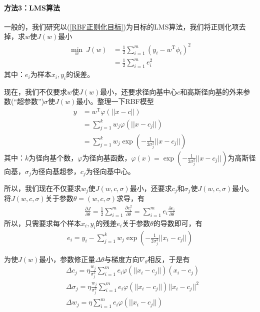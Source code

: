             \paragraph{方法3：LMS算法}
            一般的，我们研究以(\ref{RBF正则化目标})为目标的LMS算法，我们将正则化项去掉，求$w$使$J(w)$最小
            \begin{align*}
            \min_w \ J(w) & = \frac{1}{2} \sum_{i=1}^m \left( y_i - w^\mathrm{T}\phi_i \right) ^2 \\
            & = \frac{1}{2}\sum_{i=1}^m e_i^2
            \end{align*}
            其中：$e_i$为样本$x_i,y_i$的误差。
            \par
            现在，我们不仅要求$w$使$J(w)$最小，还要求径向基中心$c$和高斯径向基的外来参数(“超参数”)$\sigma$使$J(w)$最小。整理一下RBF模型
            \begin{align*}
            y & = w^\mathrm{T}\varphi(||x-c||)\\
            & =\sum_{j=1}^k w_j\varphi(||x-c_j||)\\
            & =\sum_{j=1}^k w_j\exp \left( -\frac{1}{2\sigma_j^2}||x-c_j|| \right)
            \end{align*}
            其中：$k$为径向基个数，$\varphi$为径向基函数，$\varphi(x) = \exp \left( -\frac{1}{2\sigma_j^2}||x-c_j|| \right) $为高斯径向基，$\sigma_j$为径向基超参，$c_j$为径向基中心。
            \par
            所以，我们现在不仅要求$w_j$使$J(w,c,\sigma)$最小，还要求$c_j$和$\sigma_j$使$J(w,c,\sigma)$最小。将$J(w,c,\sigma)$关于参数$\theta = (w,c,\sigma)$求导，有
            \begin{align*}
            \frac{\partial J}{\partial \theta} = \frac{1}{2} \sum_{i=1}^m \frac{\partial e_i^2}{\partial \theta} = \sum_{i=1}^m e_i \frac{\partial e_i}{\partial \theta}
            \end{align*}
            所以，只需要求每个样本$x_i,y_i$的残差$e_i$关于参数$\theta$的导数即可，有
            \begin{align*}
            e_i = y_i - \sum_{j=1}^k w_j\exp \left( -\frac{1}{2\sigma_j^2}||x_i-c_j|| \right)
            \end{align*}
            \par
            为使$J(w)$最小，参数修正量$\Delta \theta$与梯度方向$\nabla_\theta$相反，于是有
            \begin{align*}
            & \Delta c_j = \eta \frac{w_j}{\sigma_j^2} \sum_{i=1}^m e_i \varphi (||x_i-c_j||)(x_i-c_j)\\
            & \Delta \sigma_j = \eta \frac{w_j}{\sigma_j^2} \sum_{i=1}^m e_i \varphi (||x_i-c_j||)||x_i-c_j||^2\\
            & \Delta w_j = \eta \sum_{i=1}^m e_i\varphi (||x_i-c_j||)
            \end{align*}
